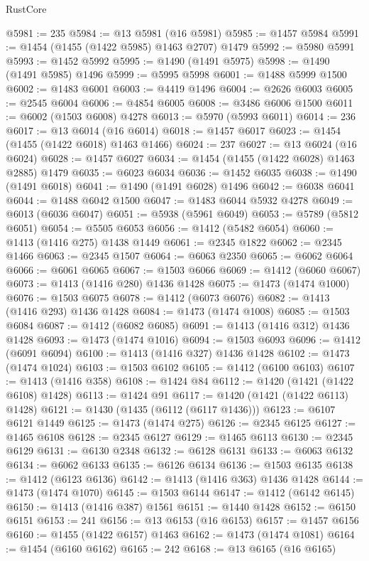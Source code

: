 \begin{lexlean}{RustCore}
\begin{coremodule}
@5981 := 235
@5984 := @13 @5981 (@16 @5981)
@5985 := @1457 @5984
@5991 := @1454 (@1455 (@1422 @5985) @1463 @2707) @1479
@5992 := @5980 @5991
@5993 := @1452 @5992
@5995 := @1490 (@1491 @5975)
@5998 := @1490 (@1491 @5985) @1496
@5999 := @5995 @5998
@6001 := @1488 @5999 @1500
@6002 := @1483 @6001
@6003 := @4419 @1496
@6004 := @2626 @6003
@6005 := @2545 @6004
@6006 := @4854 @6005
@6008 := @3486 @6006 @1500
@6011 := @6002 (@1503 @6008) @4278
@6013 := @5970 (@5993 @6011)
@6014 := 236
@6017 := @13 @6014 (@16 @6014)
@6018 := @1457 @6017
@6023 := @1454 (@1455 (@1422 @6018) @1463 @1466)
@6024 := 237
@6027 := @13 @6024 (@16 @6024)
@6028 := @1457 @6027
@6034 := @1454 (@1455 (@1422 @6028) @1463 @2885) @1479
@6035 := @6023 @6034
@6036 := @1452 @6035
@6038 := @1490 (@1491 @6018)
@6041 := @1490 (@1491 @6028) @1496
@6042 := @6038 @6041
@6044 := @1488 @6042 @1500
@6047 := @1483 @6044 @5932 @4278
@6049 := @6013 (@6036 @6047)
@6051 := @5938 (@5961 @6049)
@6053 := @5789 (@5812 @6051)
@6054 := @5505 @6053
@6056 := @1412 (@5482 @6054)
@6060 := @1413 (@1416 @275) @1438 @1449
@6061 := @2345 @1822
@6062 := @2345 @1466
@6063 := @2345 @1507
@6064 := @6063 @2350
@6065 := @6062 @6064
@6066 := @6061 @6065
@6067 := @1503 @6066
@6069 := @1412 (@6060 @6067)
@6073 := @1413 (@1416 @280) @1436 @1428
@6075 := @1473 (@1474 @1000)
@6076 := @1503 @6075
@6078 := @1412 (@6073 @6076)
@6082 := @1413 (@1416 @293) @1436 @1428
@6084 := @1473 (@1474 @1008)
@6085 := @1503 @6084
@6087 := @1412 (@6082 @6085)
@6091 := @1413 (@1416 @312) @1436 @1428
@6093 := @1473 (@1474 @1016)
@6094 := @1503 @6093
@6096 := @1412 (@6091 @6094)
@6100 := @1413 (@1416 @327) @1436 @1428
@6102 := @1473 (@1474 @1024)
@6103 := @1503 @6102
@6105 := @1412 (@6100 @6103)
@6107 := @1413 (@1416 @358)
@6108 := @1424 @84
@6112 := @1420 (@1421 (@1422 @6108) @1428)
@6113 := @1424 @91
@6117 := @1420 (@1421 (@1422 @6113) @1428)
@6121 := @1430 (@1435 (@6112 (@6117 @1436)))
@6123 := @6107 @6121 @1449
@6125 := @1473 (@1474 @275)
@6126 := @2345 @6125
@6127 := @1465 @6108
@6128 := @2345 @6127
@6129 := @1465 @6113
@6130 := @2345 @6129
@6131 := @6130 @2348
@6132 := @6128 @6131
@6133 := @6063 @6132
@6134 := @6062 @6133
@6135 := @6126 @6134
@6136 := @1503 @6135
@6138 := @1412 (@6123 @6136)
@6142 := @1413 (@1416 @363) @1436 @1428
@6144 := @1473 (@1474 @1070)
@6145 := @1503 @6144
@6147 := @1412 (@6142 @6145)
@6150 := @1413 (@1416 @387) @1561
@6151 := @1440 @1428
@6152 := @6150 @6151
@6153 := 241
@6156 := @13 @6153 (@16 @6153)
@6157 := @1457 @6156
@6160 := @1455 (@1422 @6157) @1463
@6162 := @1473 (@1474 @1081)
@6164 := @1454 (@6160 @6162)
@6165 := 242
@6168 := @13 @6165 (@16 @6165)

\end{coremodule}
\end{lexlean}
